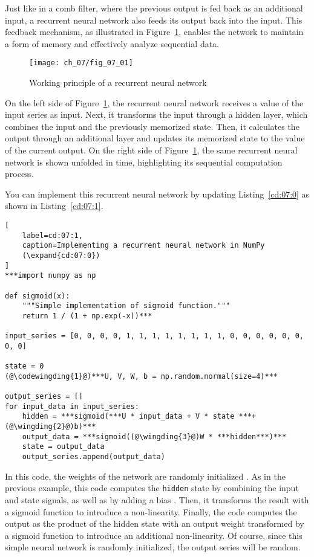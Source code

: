 Just like in a comb filter, where the previous output is fed back as an additional input, a recurrent neural network also feeds its output back into the input. This feedback mechanism, as illustrated in Figure~\ref{fig:07:01}, enables the network to maintain a form of memory and effectively analyze sequential data.

\begin{figure}[H]
	\texttt{[image: ch\_07/fig\_07\_01]} %
	\caption{Working principle of a recurrent neural network}
	\label{fig:07:01}
\end{figure}

On the left side of Figure~\ref{fig:07:01}, the recurrent neural network receives a value of the input series as input. Next, it transforms the input through a hidden layer, which combines the input and the previously memorized state. Then, it calculates the output through an additional layer and updates its memorized state to the value of the current output.
On the right side of Figure~\ref{fig:07:01}, the same recurrent neural network is shown unfolded in time, highlighting its sequential computation process.

You can implement this recurrent neural network by updating Listing~\ref{cd:07:0} as shown in Listing~\ref{cd:07:1}. 
\begin{lstlisting}[
	label=cd:07:1,
	caption=Implementing a recurrent neural network in NumPy
    (\expand{cd:07:0})
]
***import numpy as np

def sigmoid(x):
    """Simple implementation of sigmoid function."""
    return 1 / (1 + np.exp(-x))***

input_series = [0, 0, 0, 0, 1, 1, 1, 1, 1, 1, 1, 1, 0, 0, 0, 0, 0, 0, 0, 0]

state = 0
(@\codewingding{1}@)***U, V, W, b = np.random.normal(size=4)***

output_series = []
for input_data in input_series:
    hidden = ***sigmoid(***U * input_data + V * state ***+ (@\wingding{2}@)b)***
    output_data = ***sigmoid((@\wingding{3}@)W * ***hidden***)***
    state = output_data
    output_series.append(output_data)
\end{lstlisting}
In this code, the weights of the network are randomly initialized .
As in the previous example, this code computes the \lstinline{hidden} state by combining the input and state signals, as well as by adding a bias . Then, it transforms the result with a sigmoid function to introduce a non-linearity.
Finally, the code computes the output as the product of the hidden state with an output weight  transformed by a sigmoid function to introduce an additional non-linearity.
Of course, since this simple neural network is randomly initialized, the output series will be random.

